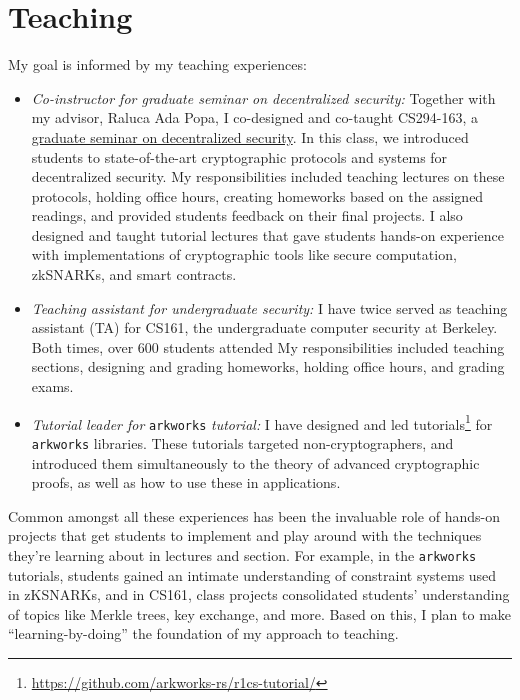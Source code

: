 \documentclass[11pt,letterpaper]{article}
\theoremstyle{definition} %
\theoremstyle{remark} %
\newcommand{\arkworks}{\texttt{arkworks}}
\begin{document}
\section{Teaching}
\label{sec:teaching}
My goal is informed by my teaching experiences:
\begin{itemize}[nolistsep]
  \item \emph{Co-instructor for graduate seminar on decentralized security:} Together with my advisor, Raluca Ada Popa, I co-designed and co-taught CS294-163, a \href{https://inst.eecs.berkeley.edu/~cs294-163/fa19/}{graduate seminar on decentralized security}. In this class, we introduced students to state-of-the-art cryptographic protocols and systems for decentralized security. My responsibilities included teaching lectures on these protocols, holding office hours, creating homeworks based on the assigned readings, and provided students feedback on their final projects. I also designed and taught tutorial lectures that gave students hands-on experience with implementations of cryptographic tools like secure computation, zkSNARKs, and smart contracts.

  \item \emph{Teaching assistant for undergraduate security:} I have twice served as teaching assistant (TA) for CS161, the undergraduate computer security at Berkeley.  Both times, over 600 students attended My responsibilities included teaching sections, designing and grading homeworks, holding office hours, and grading exams.

  \item \emph{Tutorial leader for} \arkworks{} \emph{tutorial:} I have designed and led tutorials\footnote{\url{https://github.com/arkworks-rs/r1cs-tutorial/}} for \arkworks{} libraries. These tutorials targeted non-cryptographers, and introduced them simultaneously to the theory of advanced cryptographic proofs, as well as how to use these in applications. 
\end{itemize}

Common amongst all these experiences has been the invaluable role of hands-on projects that get students to implement and play around with the techniques they're learning about in lectures and section. For example, in the \arkworks{} tutorials, students gained an intimate understanding of constraint systems used in zKSNARKs, and in CS161, class projects consolidated students' understanding of topics like Merkle trees, key exchange, and more. Based on this, I plan to make ``learning-by-doing'' the foundation of my approach to teaching. 
\end{document}
